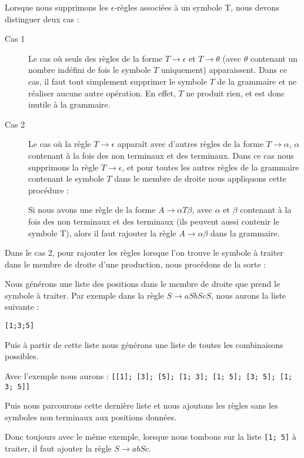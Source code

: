 \documentclass[11pt,a4paper]{article}
\def\code#1{\texttt{#1}} %
\begin{document}
Lorsque nous supprimons les $\epsilon$-règles associées à un 
symbole T, nous devons distinguer deux cas : 
\begin{description}
    \item[Cas 1] Le cas où seuls des règles de la forme
        $T \rightarrow \epsilon$ et $T \rightarrow \theta$
        (avec $\theta$ contenant un nombre indéfini de
        fois le symbole $T$ uniquement) apparaissent. Dans ce cas, il faut 
        tout simplement supprimer le symbole $T$ de la grammaire et ne réaliser
        aucune autre opération. En effet, $T$ ne produit rien, et est
        donc inutile à la grammaire.
    \item[Cas 2] Le cas où la règle $T \rightarrow \epsilon$ apparaît avec d'autres
        règles de la forme $T \rightarrow \alpha$, $\alpha$ contenant
        à la fois des non terminaux et des terminaux. Dans ce cas nous supprimons
        la règle $T \rightarrow \epsilon$, et pour toutes les autres règles de la grammaire
        contenant le symbole $T$ dans le membre de droite nous appliquons cette
        procédure : 
        
        Si nous avons une règle de la forme $A \rightarrow \alpha T \beta$,
        avec $\alpha$ et $\beta$ contenant à la fois des non terminaux et des terminaux
        (ils peuvent aussi contenir  le symbole T), alors il faut rajouter la règle
        $A \rightarrow \alpha \beta$ dans la grammaire.
\end{description}

Dans le cas 2, pour rajouter les règles lorsque l'on trouve le symbole à traiter dans
le membre de droite d'une production, nous procédons de la sorte : 

Nous générons une liste des positions dans le membre de droite que prend le symbole à traiter.
Par exemple dans la règle $S \rightarrow aSbScS$, nous aurons la liste suivante : 

\code{[1;3;5]}

Puis à partir de cette liste nous générons une liste de toutes les combinaisons possibles.

Avec l'exemple nous aurons : \code{[[1]; [3]; [5]; [1; 3]; [1; 5]; [3; 5]; [1; 3; 5]]}

Puis nous parcourons cette dernière liste et nous ajoutons les règles sans les symboles 
non terminaux aux positions données.

Donc toujours avec le même exemple, lorsque nous tombons sur la liste \code{[1; 5]} à traiter, il faut ajouter
la règle $S \rightarrow abSc $.
\end{document}
